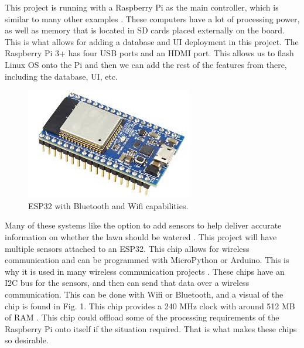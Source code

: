 \documentclass[letterpaper, 10 pt, conference]{ieeeconf}  %
\begin{document}
This project is running with a Raspberry Pi as the main controller, which is similar to many other examples \cite{SIP}. These computers have a lot of processing power, as well as memory that is located in SD cards placed externally on the board. This is what allows for adding a database and UI deployment in this project. The Raspberry Pi 3+ has four USB ports and an HDMI port. This allows us to flash Linux OS onto the Pi and then we can add the rest of the features from there, including the database, UI, etc. 


\begin{figure}[H]
    \centering
    \includegraphics[scale=.5]{ESP32.jpg}
    \caption{ESP32 with Bluetooth and Wifi capabilities.}
    \label{fig:my_label}
\end{figure}

Many of these systems like the option to add sensors to help deliver accurate information on whether the lawn should be watered \cite{OpenSprinkler}. This project will have multiple sensors attached to an ESP32. This chip allows for wireless communication and can be programmed with MicroPython or Arduino. This is why it is used in many wireless communication projects \cite{OpenSprinkler}. These chips have an I2C bus for the sensors, and then can send that data over a wireless communication. This can be done with Wifi or Bluetooth, and a visual of the chip is found in Fig. 1. This chip provides a 240 MHz clock with around 512 MB of RAM \cite{Micropython}. This chip could offload some of the processing requirements of the Raspberry Pi onto itself if the situation required. That is what makes these chips so desirable. 
\end{document}
